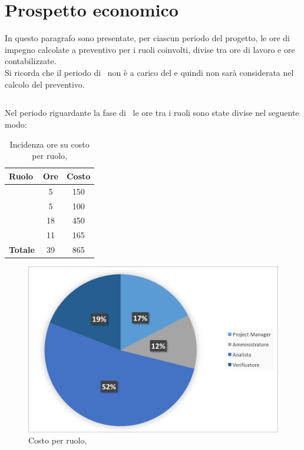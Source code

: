 \newpage
\section{Prospetto economico}
In questo paragrafo sono presentate, per ciascun periodo del progetto, le ore di impegno calcolate a preventivo per i ruoli coinvolti, divise tra ore di lavoro e ore contabilizzate.\\
 Si ricorda che il periodo di \ARM\ non è a carico del  e quindi non sarà considerata nel calcolo del preventivo.
 
\subsection{\ARD}
Nel periodo riguardante la fase di \ARD\ le ore tra i ruoli sono state divise nel seguente modo:

\begin{table}[h]
	\begin{center}
		\begin{tabular}{|l|c|c|}
			\hline
			\textbf{Ruolo}	& \textbf{Ore} & \textbf{Costo} \\
			\hline
			\textit{\Pm} &	5	&	 150	\\
			\hline
			\textit{\Am}	&	5	&	 100	\\
			\hline
			\textit{\An}	&	18	&	 450	\\
			\hline
			\textit{\Ver}	 & 11	&	 165	\\
			\hline
			\textbf{Totale} &	 39	&	865	\\
			\hline
		\end{tabular}
	\end{center}
	\caption{Incidenza ore su costo per ruolo, \ARD}
\end{table}

\begin{figure}[H]
	\centering 
	\includegraphics[scale=0.7]{Immagini/GraficiTorteSezione6/ARD.png}
	\caption{Costo per ruolo, \ARD}
\end{figure}

